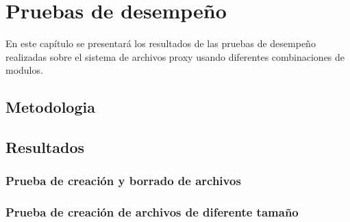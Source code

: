 \chapter{Pruebas de desempeño}
\ifpdf
    \graphicspath{{Chapter3/Chapter3Figs/PNG/}{Chapter3/Chapter3Figs/PDF/}{Chapter3/Chapter3Figs/}}
\else
    \graphicspath{{Chapter3/Chapter3Figs/EPS/}{Chapter3/Chapter3Figs/}}
\fi

En este capítulo se presentará los resultados de las pruebas de desempeño realizadas sobre el sistema de archivos proxy usando diferentes combinaciones de modulos.


\section{Metodologia}




\section{Resultados}



\subsection{Prueba de creación y borrado de archivos}



\subsection{Prueba de creación de archivos de diferente tamaño}





